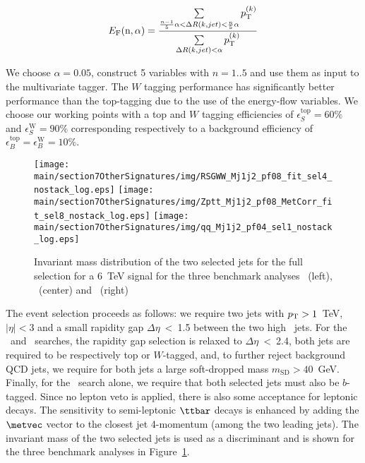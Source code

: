 \begin{equation}
E_\text{F}(\text{n},\alpha) =  \frac{\sum \limits_{\frac{n-1}{5}\alpha < \Delta R(k,jet)< \frac{n}{5}\alpha} p_{\text{T}}^{(k)}}{\sum \limits_{\Delta R(k,jet)< \alpha} p_{\text{T}}^{(k)}}
\end{equation}

We choose $\alpha=0.05$, construct 5 variables \eflow with $n=1..5$ and use them as input to the multivariate tagger. The $W$ tagging performance has significantly better performance than the top-tagging due to the use of the energy-flow variables. We choose our working points with a top and $W$ tagging efficiencies of $\epsilon_S^{\text{top}}=60\%$ and $\epsilon_S^{\text{W}}=90\%$ corresponding respectively to a background efficiency of $\epsilon_B^{\text{top}}=\epsilon_B^{\text{W}}=10\%$.


\begin{figure}[ht]
  \centering
  \texttt{[image: \\main/section7OtherSignatures/img/RSGWW\_Mj1j2\_pf08\_fit\_sel4\_nostack\_log.eps]}
  \texttt{[image: \\main/section7OtherSignatures/img/Zptt\_Mj1j2\_pf08\_MetCorr\_fit\_sel8\_nostack\_log.eps]}
  \texttt{[image: \\main/section7OtherSignatures/img/qq\_Mj1j2\_pf04\_sel1\_nostack\_log.eps]}
  \caption{Invariant mass distribution of the two selected jets for the full selection for a 6~TeV signal for the three benchmark analyses  \zptt\ (left),  \rsg\ (center) and \qjj\ (right)}
  \label{fig:hadres_invmass}
\end{figure}

The event selection proceeds as follows:  we require two jets with $p_\text{T}>1$~TeV, $|\eta|<3$ and a small rapidity gap $\Delta\eta$~<~1.5 between the two high \pt\ jets. For the \zptt\ and \rsg\ searches, the rapidity gap selection is relaxed to $\Delta\eta$~<~2.4, both jets are required to be respectively top or $W$-tagged, and, to further reject background QCD jets, we require for both jets a large soft-dropped mass $m_\text{SD}>40$~GeV. Finally, for the \zptt\ search alone, we require that both selected jets must also be $b$-tagged. Since no lepton veto is applied, there is also some acceptance for leptonic decays. The sensitivity to semi-leptonic $\ttbar$ decays is enhanced by adding the $\metvec$ vector to the closest jet 4-momentum (among the two leading jets). The invariant mass of the two selected jets is used as a discriminant and is shown for the three benchmark analyses in Figure~\ref{fig:hadres_invmass}.


